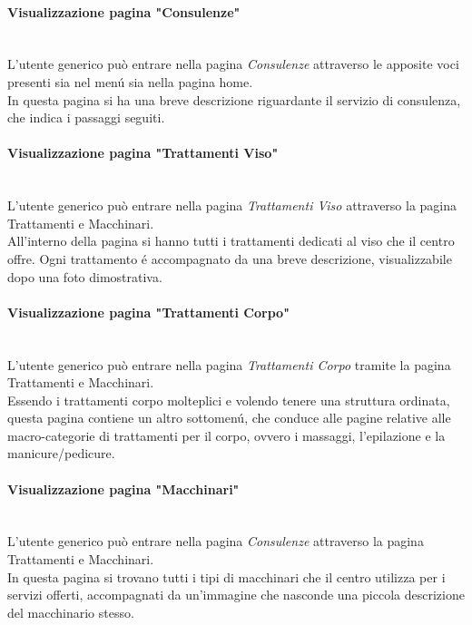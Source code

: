\documentclass{article}
\begin{document}
\paragraph{Visualizzazione pagina "Consulenze"}\mbox{}\\
L'utente generico può entrare nella pagina \textit{Consulenze} attraverso le apposite voci presenti sia nel menú sia nella pagina home.\\
In questa pagina si ha una breve descrizione riguardante il servizio di consulenza, che indica i passaggi seguiti.

\paragraph{Visualizzazione pagina "Trattamenti Viso"}\mbox{}\\
L'utente generico può entrare nella pagina \textit{Trattamenti Viso} attraverso la pagina Trattamenti e Macchinari.\\
All'interno della pagina si hanno tutti i trattamenti dedicati al viso che il centro offre. Ogni trattamento é accompagnato da una breve descrizione, visualizzabile dopo una foto dimostrativa.

\paragraph{Visualizzazione pagina "Trattamenti Corpo"}\mbox{}\\
L'utente generico può entrare nella pagina \textit{Trattamenti Corpo} tramite la pagina Trattamenti e Macchinari.\\
Essendo i trattamenti corpo molteplici e volendo tenere una struttura ordinata, questa pagina contiene un altro sottomenú, che conduce alle pagine relative alle macro-categorie di trattamenti per il corpo, ovvero i massaggi, l'epilazione e la manicure/pedicure.

\paragraph{Visualizzazione pagina "Macchinari"}\mbox{}\\
L'utente generico può entrare nella pagina \textit{Consulenze} attraverso la pagina Trattamenti e Macchinari.\\
In questa pagina si trovano tutti i tipi di macchinari che il centro utilizza per i servizi offerti, accompagnati da un'immagine che nasconde una piccola descrizione del macchinario stesso.
\end{document}
